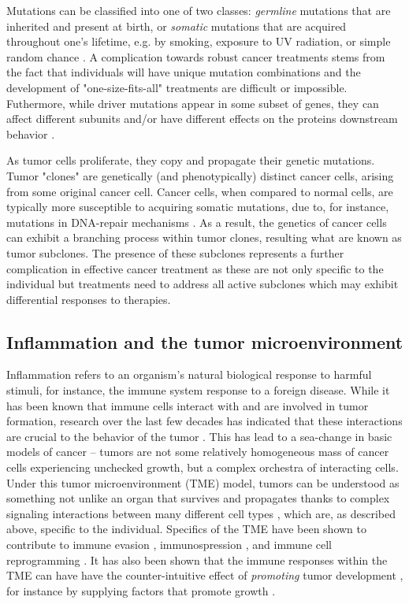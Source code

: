 Mutations can be classified into one of two classes:
\emph{germline} mutations that are inherited and present at birth, or
\emph{somatic} mutations that are acquired throughout one's lifetime, e.g. by smoking, exposure to UV radiation, or simple random chance \cite{hanahan2011}.
A complication towards robust cancer treatments stems from the fact that individuals will have unique mutation combinations and the development of "one-size-fits-all" treatments are difficult or impossible.
Futhermore, while driver mutations appear in some subset of genes, they can affect different subunits and/or have different effects on the proteins downstream behavior \cite{smiech2020}.

As tumor cells proliferate, they copy and propagate their genetic mutations.
Tumor "clones" are genetically (and phenotypically) distinct cancer cells, arising from some original cancer cell.
Cancer cells, when compared to normal cells, are typically more susceptible to acquiring somatic mutations, due to, for instance, mutations in DNA-repair mechanisms \cite{negrini2010,salk2010}.
As a result, the genetics of cancer cells can exhibit a branching process within tumor clones, resulting what are known as tumor subclones.
The presence of these subclones represents a further complication in effective cancer treatment as these are not only specific to the individual but treatments need to address all active subclones which may exhibit differential responses to therapies.

\subsection{Inflammation and the tumor microenvironment}
Inflammation refers to an organism's natural biological response to harmful stimuli,
for instance, the immune system response to a foreign disease.
While it has been known that immune cells interact with and are involved in tumor formation, research over the last few decades has indicated that these interactions are crucial to the behavior of the tumor \cite{grivennikov2010, quail2013}.
This has lead to a sea-change in basic models of cancer -- tumors are not some relatively homogeneous mass of cancer cells experiencing unchecked growth, but a complex orchestra of interacting cells.
Under this tumor microenvironment (TME) model, tumors can be understood as something not unlike an organ that survives and propagates thanks to complex signaling interactions between many different cell types \cite{balkwill2012}, which are, as described above, specific to the individual.
Specifics of the TME have been shown to contribute to immune evasion \cite{pansy2021},
immunospression \cite{balta2021}, and immune cell reprogramming \cite{cao2022}.
It has also been shown that the immune responses within the TME can have 
have the counter-intuitive effect of \emph{promoting} tumor development \cite{hanahan2011}, for instance by supplying factors that promote growth \cite{denardo2010}.


